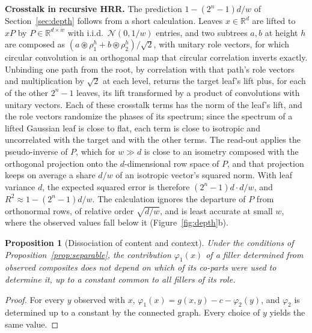 \documentclass[10pt]{article}
\theoremstyle{plain}
\newtheorem{proposition}{Proposition}
\theoremstyle{remark}
\newcommand{\R}{\mathbb{R}}
\begin{document}
\noindent
\textbf{Crosstalk in recursive HRR.} The prediction $1 - (2^n - 1)d/w$ of Section~\ref{sec:depth} follows from a short calculation. Leaves $x \in \R^d$ are lifted to $xP$ by $P \in \R^{d \times w}$ with i.i.d.\ $\mathcal{N}(0, 1/w)$ entries, and two subtrees $a, b$ at height $h$ are composed as $(a \circledast \rho^h_1 + b \circledast \rho^h_2)/\sqrt{2}$, with unitary role vectors, for which circular convolution is an orthogonal map that circular correlation inverts exactly. Unbinding one path from the root, by correlation with that path's role vectors and multiplication by $\sqrt{2}$ at each level, returns the target leaf's lift plus, for each of the other $2^n - 1$ leaves, its lift transformed by a product of convolutions with unitary vectors. Each of these crosstalk terms has the norm of the leaf's lift, and the role vectors randomize the phases of its spectrum; since the spectrum of a lifted Gaussian leaf is close to flat, each term is close to isotropic and uncorrelated with the target and with the other terms. The read-out applies the pseudo-inverse of $P$, which for $w \gg d$ is close to an isometry composed with the orthogonal projection onto the $d$-dimensional row space of $P$, and that projection keeps on average a share $d/w$ of an isotropic vector's squared norm. With leaf variance $d$, the expected squared error is therefore $(2^n - 1)d \cdot d/w$, and $R^2 \approx 1 - (2^n - 1)d/w$. The calculation ignores the departure of $P$ from orthonormal rows, of relative order $\sqrt{d/w}$, and is least accurate at small $w$, where the observed values fall below it (Figure~\ref{fig:depth}b).

\begin{proposition}[Dissociation of content and context]
\label{prop:context}
Under the conditions of Proposition~\ref{prop:separable}, the contribution $\varphi_1(x)$ of a filler determined from observed composites does not depend on which of its co-parts were used to determine it, up to a constant common to all fillers of its role.
\end{proposition}

\begin{proof}
For every $y$ observed with $x$, $\varphi_1(x) = g(x, y) - c - \varphi_2(y)$, and $\varphi_2$ is determined up to a constant by the connected graph. Every choice of $y$ yields the same value.
\end{proof}
\end{document}
